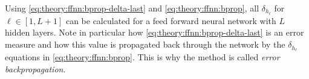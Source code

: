 Using \eqref{eq:theory:ffnn:bprop-delta-last} and \eqref{eq:theory:ffnn:bprop}, all $\delta_{h_\ell}$ for $\ell \in [1, L+1]$ can be calculated for a feed forward neural network with $L$ hidden layers. Note in particular how \eqref{eq:theory:ffnn:bprop-delta-last} is an error measure and how this value is propagated back through the network by the $\delta_{h_\ell}$ equations in \eqref{eq:theory:ffnn:bprop}. This is why the method is called \textit{error backpropagation}.
